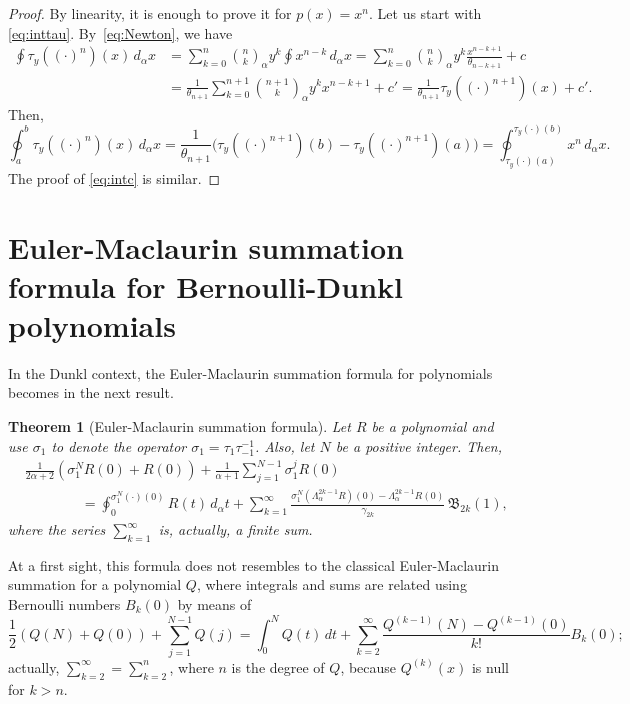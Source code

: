 \documentclass[10pt]{article}
\theoremstyle{plain}
\newtheorem{theorem}{Theorem}[section]
\theoremstyle{definition}
\numberwithin{equation}{section} %
\newcommand{\La}{\Lambda_{\alpha}}
\newcommand{\binoma}[2]{\binom{#1}{#2}_{\!\alpha}}
\newcommand{\B}{\mathfrak{B}}
\newcommand{\cc}{\gamma}
\begin{document}
\begin{proof}
By linearity, it is enough to prove it for $p(x) = x^n$.
Let us start with \eqref{eq:inttau}. By~\eqref{eq:Newton}, we have
\begin{align*}
  \oint \tau_y ((\cdot)^n)(x)\,d_\alpha x
  &= \sum_{k=0}^n \binoma{n}{k} y^k \oint x^{n-k}\,d_\alpha x 
  = \sum_{k=0}^n \binoma{n}{k} y^k \frac{x^{n-k+1}}{\theta_{n-k+1}} + c \\
  &= \frac{1}{\theta_{n+1}} \sum_{k=0}^{n+1} \binoma{n+1}{k} y^k x^{n-k+1} + c'
  = \frac{1}{\theta_{n+1}} \tau_y((\cdot)^{n+1})(x) + c'.
\end{align*}
Then,
\[
  \oint_a^b \tau_y ((\cdot)^n)(x)\,d_\alpha x 
  = \frac{1}{\theta_{n+1}} \Big(\tau_y((\cdot)^{n+1})(b) - \tau_y((\cdot)^{n+1})(a)\Big)
  = \oint_{\tau_y(\cdot)(a)}^{\tau_y(\cdot)(b)} x^n\,d_\alpha x.
\]
The proof of \eqref{eq:intc} is similar.
\end{proof}

\section{Euler-Maclaurin summation formula for Ber\-nou\-lli-Dunkl polynomials}
\label{sec:EML}

In the Dunkl context, the Euler-Maclaurin summation formula for polynomials becomes in the next result.

\begin{theorem}[Euler-Maclaurin summation formula]
\label{teo:EML}
Let $R$ be a polynomial and use $\sigma_1$ to denote the operator $\sigma_1 = \tau_1\tau_{-1}^{-1}$.
Also, let $N$ be a positive integer.
Then, 
\begin{equation}
\label{eq:EMLdunkl}
\begin{aligned}
  &\frac{1}{2\alpha+2} (\sigma_1^{N} R(0) + R(0)) + \frac{1}{\alpha+1} \sum_{j=1}^{N-1} \sigma_1^{j} R(0) \\
  &\qquad\qquad = \oint_{0}^{\sigma_1^{N}(\cdot)(0)} R(t) \, d_\alpha t 
  + \sum_{k=1}^{\infty} 
  \frac{\sigma_1^{N}(\La^{2k-1}R)(0) - \La^{2k-1}R(0)}{\cc_{2k}} \, \B_{2k}(1),
\end{aligned}
\end{equation}
where the series $\sum_{k=1}^{\infty}$ is, actually, a finite sum. 
\end{theorem}

At a first sight, this formula does not resembles to the classical Euler-Maclaurin summation for a polynomial $Q$, where integrals and sums are related using Bernoulli numbers $B_k(0)$ by means of
\begin{equation}
\label{eq:EMLclasico}
  \frac{1}{2}(Q(N)+Q(0)) + \sum_{j=1}^{N-1} Q(j) = \int_{0}^{N} Q(t)\,dt 
  + \sum_{k=2}^{\infty} \frac{Q^{(k-1)}(N) - Q^{(k-1)}(0)}{k!} B_k(0);
\end{equation}
actually, $\sum_{k=2}^{\infty} = \sum_{k=2}^{n}$,
where $n$ is the degree of $Q$, because $Q^{(k)}(x)$ is null for $k>n$.
\end{document}
